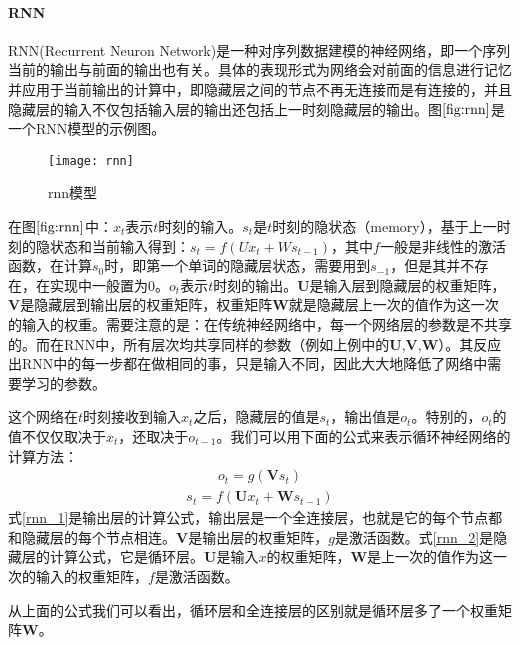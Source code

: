  \paragraph{RNN}
RNN(Recurrent Neuron Network)是一种对序列数据建模的神经网络，即一个序列当前的输出与前面的输出也有关。具体的表现形式为网络会对前面的信息进行记忆并应用于当前输出的计算中，即隐藏层之间的节点不再无连接而是有连接的，并且隐藏层的输入不仅包括输入层的输出还包括上一时刻隐藏层的输出。图$\ref{fig:rnn}$是一个RNN模型的示例图。
\begin{figure}[htbp]
\centering
\texttt{[image: rnn]}
\caption{rnn模型}
\label{fig:rnn}
\end{figure}

在图$\ref{fig:rnn}$中：$x_{t}$表示$t$时刻的输入。$s_{t}$是$t$时刻的隐状态（memory），基于上一时刻的隐状态和当前输入得到：$s_t=f(U x_{t}+W s_{t−1})$，其中$f$一般是非线性的激活函数，在计算$s_{0}$时，即第一个单词的隐藏层状态，需要用到$s_{−1}$，但是其并不存在，在实现中一般置为0。$o_{t}$表示$t$时刻的输出。$\mathbf{U}$是输入层到隐藏层的权重矩阵，$\mathbf{V}$是隐藏层到输出层的权重矩阵，权重矩阵$\mathbf{W}$就是隐藏层上一次的值作为这一次的输入的权重。需要注意的是：在传统神经网络中，每一个网络层的参数是不共享的。而在RNN中，所有层次均共享同样的参数（例如上例中的$\mathbf{U}$,$\mathbf{V}$,$\mathbf{W}$）。其反应出RNN中的每一步都在做相同的事，只是输入不同，因此大大地降低了网络中需要学习的参数。

这个网络在$t$时刻接收到输入$x_{t}$之后，隐藏层的值是$s_{t}$，输出值是$o_{t}$。特别的，$o_{t}$的值不仅仅取决于$x_{t}$，还取决于$o_{t-1}$。我们可以用下面的公式来表示循环神经网络的计算方法：
\begin{equation}
\label{rnn_1}
\begin{aligned}
o_{t}=g(\mathbf{V}s_{t})
\end{aligned}
\end{equation}
\begin{equation}
\label{rnn_2}
\begin{aligned}
s_{t}=f(\mathbf{U}x_{t}+\mathbf{W}s_{t-1})
\end{aligned}
\end{equation}
式\eqref{rnn_1}是输出层的计算公式，输出层是一个全连接层，也就是它的每个节点都和隐藏层的每个节点相连。$\mathbf{V}$是输出层的权重矩阵，$g$是激活函数。式\eqref{rnn_2}是隐藏层的计算公式，它是循环层。$\mathbf{U}$是输入$x$的权重矩阵，$\mathbf{W}$是上一次的值作为这一次的输入的权重矩阵，$f$是激活函数。

从上面的公式我们可以看出，循环层和全连接层的区别就是循环层多了一个权重矩阵$\mathbf{W}$。

